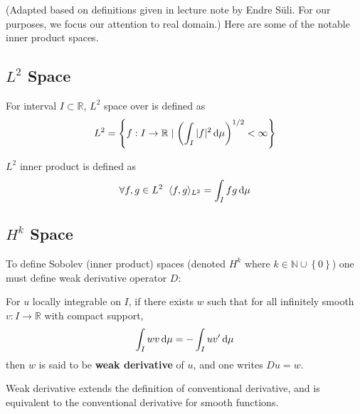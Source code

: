 \documentclass[../dissertation.tex]{subfiles}
\begin{document}
(Adapted based on definitions given in lecture note by Endre S\"uli\cite{nspde}.
For our purposes, we focus our attention to real domain.)
Here are some of the notable inner product spaces.
\subsection{$L^2$ Space}
\begin{definition}[$L^2$ Space]
    For interval $I \subset \mathbb{R}$,
    $L^2$ space over is defined as
    \begin{equation}
        L^2 = \left\{ f:I \rightarrow \mathbb{R} \left.\middle|\right. \left( \int_{I} |f|^2 \, \text{d} \mu \right)^{1/2} < \infty \right\}
    \end{equation}

    $L^2$ inner product is defined as
    \begin{equation}
        \forall f,g \in L^2 \; \; \langle f, g \rangle_{L^2} = \int_I f g \, \text{d} \mu
    \end{equation}
\end{definition}

\subsection{$H^k$ Space}
To define Sobolev (inner product) spaces (denoted $H^k$ where $k \in \mathbb{N} \cup \left\{ 0 \right\}$)
one must define weak derivative operator $D$:
\begin{definition}
    For $u$ locally integrable on $I$, if there exists $w$ such that for all infinitely smooth $v:I \rightarrow \mathbb{R}$ with compact support,
    \begin{equation}
        \int_{I} w v \, \text{d} \mu = - \int_{I} u v' \, \text{d} \mu
    \end{equation}
    then $w$ is said to be \textbf{weak derivative} of $u$, and one writes $Du = w$.
\end{definition}

Weak derivative extends the definition of conventional derivative, and is equivalent to the conventional derivative for smooth functions.
\end{document}
